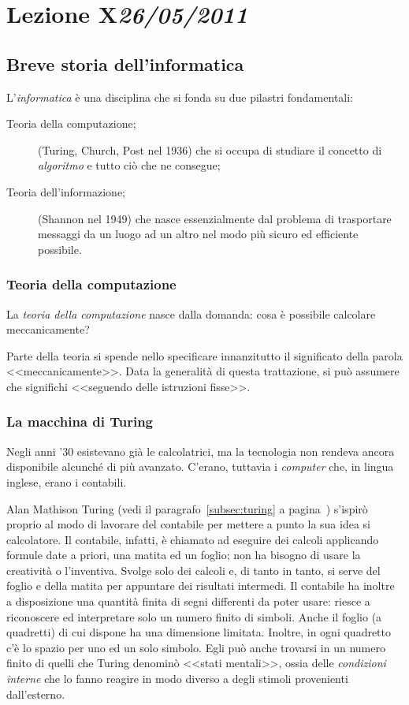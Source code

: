 \chapter[Lezione X]{Lezione X\newline\small{\emph{26/05/2011}}}
	\section{Breve storia dell'informatica}
L'\emph{informatica} è una disciplina che si fonda su due pilastri fondamentali:
\begin{description}
	\item[Teoria della computazione;] (Turing, Church, Post nel 1936) che si occupa di studiare il concetto di \emph{algoritmo} e tutto ciò che ne consegue;
	\item[Teoria dell'informazione;] (Shannon nel 1949) che nasce essenzialmente dal problema di trasportare messaggi da un luogo ad un altro nel modo più sicuro ed efficiente possibile.
\end{description}

		\subsection{Teoria della computazione}
La \emph{teoria della computazione} nasce dalla domanda: cosa è possibile calcolare meccanicamente?

Parte della teoria si spende nello specificare innanzitutto il significato della parola <<meccanicamente>>.
Data la generalità di questa trattazione, si può assumere che significhi <<seguendo delle istruzioni fisse>>.

		\subsection{La macchina di Turing}
		\label{subsec:mturing}
Negli anni '30 esistevano già le calcolatrici, ma la tecnologia non rendeva ancora disponibile alcunché di più avanzato.
C'erano, tuttavia i \emph{computer} che, in lingua inglese, erano i contabili.

Alan Mathison Turing (vedi il paragrafo~\ref{subsec:turing} a pagina~\pageref{subsec:turing}) s'ispirò proprio al modo di lavorare del contabile per mettere a punto la sua idea si calcolatore.
Il contabile, infatti, è chiamato ad eseguire dei calcoli applicando formule date a priori, una matita ed un foglio; non ha bisogno di usare la creatività o l'inventiva.
Svolge solo dei calcoli e, di tanto in tanto, si serve del foglio e della matita per appuntare dei risultati intermedi.
Il contabile ha inoltre a disposizione una quantità finita di segni differenti da poter usare: riesce a riconoscere ed interpretare solo un numero finito di simboli.
Anche il foglio (a quadretti) di cui dispone ha una dimensione limitata.
Inoltre, in ogni quadretto c'è lo spazio per uno ed un solo simbolo.
Egli può anche trovarsi in un numero finito di quelli che Turing denominò <<stati mentali>>, ossia delle \emph{condizioni interne} che lo fanno reagire in modo diverso a degli stimoli provenienti dall'esterno.

